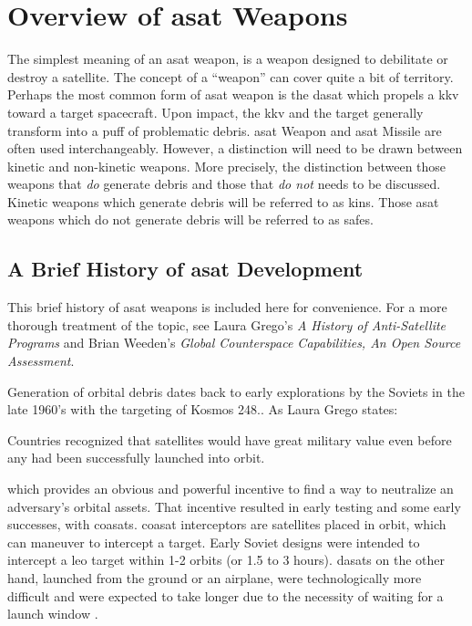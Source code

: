 \section{Overview of \acf{asat} Weapons}

The simplest meaning of an \acf{asat} weapon, is a weapon designed to
debilitate or destroy a satellite.  The concept of a ``weapon'' can
cover quite a bit of territory.  Perhaps the most common form of
\ac{asat} weapon is the \ac{dasat} which propels a \ac{kkv} toward a
target spacecraft.  Upon impact, the \ac{kkv} and the target generally
transform into a puff of problematic debris.  \acs{asat} Weapon and
\acs{asat} Missile are often used interchangeably.  However, a
distinction will need to be drawn between kinetic and non-kinetic
weapons.  More precisely, the distinction between those weapons that
\emph{do} generate debris and those that \emph{do not} needs to be
discussed.  Kinetic weapons which generate debris will be referred to
as \acp{kin}.  Those \ac{asat} weapons which do not generate debris
will be referred to as \acp{safe}.

\subsection{A Brief History of \ac{asat} Development}

This brief history of \ac{asat} weapons is included here for
convenience.  For a more thorough treatment of the topic, see Laura
Grego's {\it A History of Anti-Satellite Programs}\cite{grego} and
Brian Weeden's {\it Global Counterspace Capabilities, An Open Source
  Assessment}\cite{brian}.

Generation of orbital debris dates back to early explorations by the
Soviets in the late 1960's with the targeting of Kosmos
248.\cite[05-01]{brian}.  As Laura Grego states:
\begin{blockquote}
  Countries recognized that satellites would have great military value
  even before any had been successfully launched into
  orbit.\cite[2]{grego}
\end{blockquote}
which provides an obvious and powerful incentive to find a way to
neutralize an adversary's orbital assets. That incentive resulted in
early testing and some early successes, with \acp{coasat}.
\acs{coasat} interceptors are satellites placed in orbit, which can
maneuver to intercept a target.  Early Soviet designs were intended to
intercept a \ac{leo} target within 1-2 orbits (or 1.5 to 3 hours).
\acp{dasat} on the other hand, launched from the ground or an
airplane, were technologically more difficult\cite[4]{grego} and were
expected to take longer due to the necessity of waiting for a launch
window \cite[3]{grego}.

